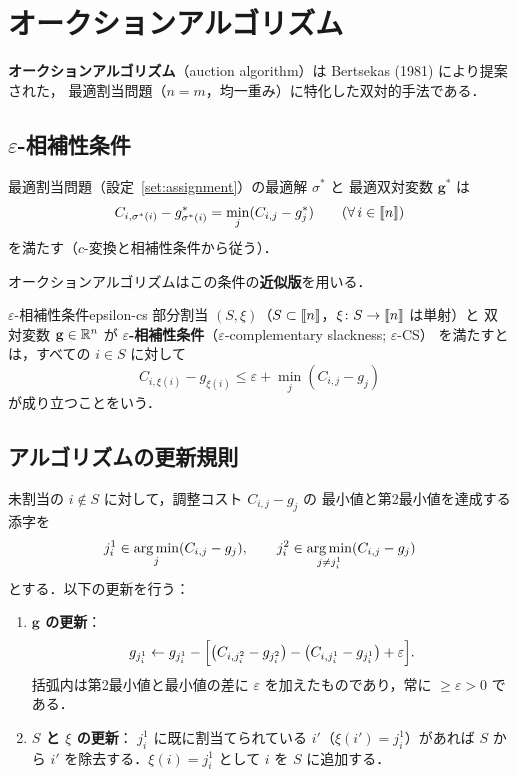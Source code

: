 \section{オークションアルゴリズム}
\label{sec:auction}

\textbf{オークションアルゴリズム}（auction algorithm）は
Bertsekas (1981) により提案された，
最適割当問題（$n = m$，均一重み）に特化した双対的手法である．

\subsection{$\varepsilon$-相補性条件}

最適割当問題（設定~\ref{set:assignment}）の最適解 $\sigma^*$ と
最適双対変数 $\mathbf{g}^*$ は
\[
  C_{i, \sigma^*(i)} - g^*_{\sigma^*(i)} = \min_{j} (C_{i,j} - g^*_j)
  \qquad (\forall\, i \in \llbracket n \rrbracket)
\]
を満たす（$c$-変換と相補性条件から従う）．

オークションアルゴリズムはこの条件の\textbf{近似版}を用いる．

\begin{definition}{$\varepsilon$-相補性条件}{epsilon-cs}
  部分割当 $(S, \xi)$（$S \subset \llbracket n \rrbracket$，$\xi \colon S \to \llbracket n \rrbracket$ は単射）と
  双対変数 $\mathbf{g} \in \mathbb{R}^n$ が
  \textbf{$\varepsilon$-相補性条件}（$\varepsilon$-complementary slackness; $\varepsilon$-CS）
  を満たすとは，すべての $i \in S$ に対して
  \[
    C_{i, \xi(i)} - g_{\xi(i)} \leq \varepsilon + \min_{j} (C_{i,j} - g_j)
  \]
  が成り立つことをいう．
\end{definition}

\subsection{アルゴリズムの更新規則}

未割当の $i \notin S$ に対して，調整コスト $C_{i,j} - g_j$ の
最小値と第2最小値を達成する添字を
\[
  j_i^1 \in \operatorname*{arg\,min}_{j} (C_{i,j} - g_j), \qquad
  j_i^2 \in \operatorname*{arg\,min}_{j \neq j_i^1} (C_{i,j} - g_j)
\]
とする．以下の更新を行う：

\begin{enumerate}
  \item \textbf{$\mathbf{g}$ の更新}：
    \[
      g_{j_i^1} \leftarrow g_{j_i^1}
      - \Bigl[\bigl(C_{i, j_i^2} - g_{j_i^2}\bigr) - \bigl(C_{i, j_i^1} - g_{j_i^1}\bigr) + \varepsilon\Bigr].
    \]
    括弧内は第2最小値と最小値の差に $\varepsilon$ を加えたものであり，常に $\geq \varepsilon > 0$ である．
  \item \textbf{$S$ と $\xi$ の更新}：
    $j_i^1$ に既に割当てられている $i'$（$\xi(i') = j_i^1$）があれば
    $S$ から $i'$ を除去する．$\xi(i) = j_i^1$ として $i$ を $S$ に追加する．
\end{enumerate}


